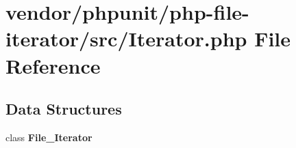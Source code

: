 \section{vendor/phpunit/php-\/file-\/iterator/src/\+Iterator.php File Reference}
\label{phpunit_2php-file-iterator_2src_2_iterator_8php}
\subsection*{Data Structures}
\begin{DoxyCompactItemize}
\item 
class {\bf File\+\_\+\+Iterator}
\end{DoxyCompactItemize}
